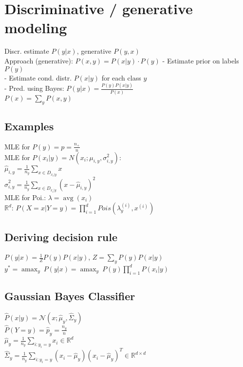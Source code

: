 \section*{Discriminative / generative modeling}
Discr. estimate $P(y|x)$, generative $P(y,x)$ \\
Approach (generative): $P(x,y) = P(x|y) \cdot P(y)$
- Estimate prior on labels $P(y)$\\
- Estimate cond. distr. $P(x|y)$ for each class $y$\\
- Pred. using Bayes:
$P(y|x) = \frac{P(y) P(x|y)}{P(x)}$\\
$P(x) = \sum_y P(x,y)$


\subsection*{Examples}
MLE for $P(y) = p = \frac{n_+}{n}$\\
MLE for $P(x_i|y) = N(x_i;\mu_{i,y}, \sigma_{i,y}^2)$:\\
$\hat{\mu}_{i,y} = \frac{1}{n_y} \sum_{x\in D_{x_i|y}} x$\\
$\hat{\sigma}_{i,y}^2 = \frac{1}{n_y} \sum_{x\in D_{x_i|y}} (x-\hat{\mu}_{i,y})^2$\\
MLE for Poi.: $\lambda = \operatorname{avg}(x_i) $\\
$\mathbb{R}^d$: $P(X = x|Y = y) = \prod_{i=1}^dPois(\lambda_y^{(i)},x^{(i)})$


\subsection*{Deriving decision rule}
$P(y|x) = \frac{1}{Z} P(y)P(x|y)$, $Z = \sum_y P(y) P(x|y)$\\
$y^* = {\operatorname{amax}_y} ~ P(y|x) = 
{\operatorname{amax}_y} ~ P(y) \prod_{i=1}^d P(x_i|y)$

\subsection*{Gaussian Bayes Classifier}
$\hat{P}(x|y) = \mathcal{N}(x ; \hat{\mu}_y, \hat{\Sigma}_y)$\\
$\hat{P}(Y=y) = \hat{p}_y = \frac{n_y}{n}$\\
$\hat{\mu}_{y} = \frac{1}{n_y} \sum_{i:y_i=y} x_i \in \mathbb{R}^d$\\
$\hat{\Sigma}_{y} = \frac{1}{n_y} \sum_{i:y_i=y} (x_i - \hat{\mu}_{y})(x_i-\hat{\mu}_y)^T \in \mathbb{R}^{d \times d}$

